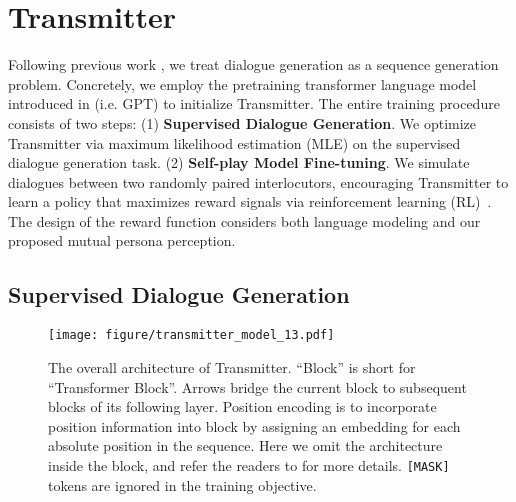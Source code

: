 \documentclass[11pt,a4paper]{article}
\begin{document}
\section{Transmitter}\label{sec-transmitter}

Following previous work \cite{li2016deep,zhang2018personalizing}, we treat dialogue generation as a sequence generation problem. Concretely, we employ the pretraining transformer language model introduced in \citet{Radford2018ImprovingLU} (i.e. GPT) to initialize Transmitter. The entire training procedure consists of two steps: (1) \textbf{Supervised Dialogue Generation}. We optimize Transmitter via maximum likelihood estimation (MLE) on the supervised dialogue generation task. (2) \textbf{Self-play Model Fine-tuning}. We simulate dialogues between two randomly paired interlocutors, encouraging Transmitter to learn a policy that maximizes reward signals via reinforcement learning (RL)~\cite{sutton2000policy}. The design of the reward function considers both language modeling and our proposed mutual persona perception.


\subsection{Supervised Dialogue Generation}\label{sec:supervised}

\begin{figure}[t]
    \centering
    \texttt{[image: figure/transmitter\_model\_13.pdf]}
    \caption{The overall architecture of Transmitter. ``Block'' is short for ``Transformer Block''. Arrows \scalebox{0.8}{$\nearrow$} bridge the current block to subsequent blocks of its following layer. Position encoding is to incorporate position information into block by assigning an embedding for each absolute position in the sequence. Here we omit the architecture inside the block, and refer the readers to \citet{vaswani2017attention} for more details. \texttt{[MASK]} tokens are ignored in the training objective.}
    \label{fig:transmitter_model}
\end{figure}
\end{document}
